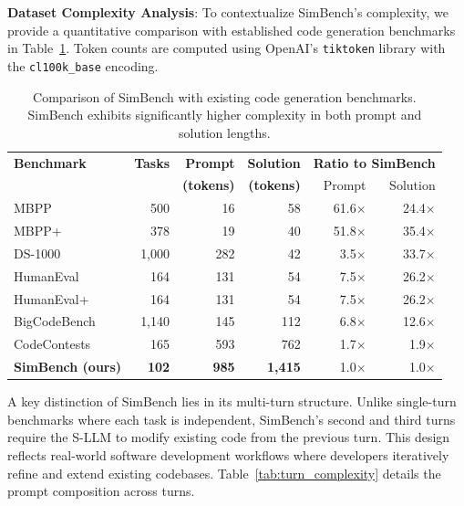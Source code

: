\documentclass{ieeeaccess}
\begin{document}
{\noindent\textbf{Dataset Complexity Analysis}}: To contextualize SimBench's complexity, we provide a quantitative comparison with established code generation benchmarks in Table~\ref{tab:benchmark_comparison}. Token counts are computed using OpenAI's \texttt{tiktoken} library with the \texttt{cl100k\_base} encoding.

\begin{table}[h!]
    \centering
    \caption{Comparison of SimBench with existing code generation benchmarks. SimBench exhibits significantly higher complexity in both prompt and solution lengths.}
    \label{tab:benchmark_comparison}
    \begin{tabular}{l r r r r r}
        \toprule
        \textbf{Benchmark} & \textbf{Tasks} & \textbf{Prompt} & \textbf{Solution} & \multicolumn{2}{c}{\textbf{Ratio to SimBench}} \\
        & & \textbf{(tokens)} & \textbf{(tokens)} & Prompt & Solution \\
        \midrule
        MBPP~\cite{austin2021program} & 500 & 16 & 58 & 61.6$\times$ & 24.4$\times$ \\
        MBPP+~\cite{liu2024your} & 378 & 19 & 40 & 51.8$\times$ & 35.4$\times$ \\
        DS-1000~\cite{lai2023ds} & 1,000 & 282 & 42 & 3.5$\times$ & 33.7$\times$ \\
        HumanEval~\cite{chen2021evaluating} & 164 & 131 & 54 & 7.5$\times$ & 26.2$\times$ \\
        HumanEval+~\cite{liu2024your} & 164 & 131 & 54 & 7.5$\times$ & 26.2$\times$ \\
        BigCodeBench~\cite{zhuo2024bigcodebench} & 1,140 & 145 & 112 & 6.8$\times$ & 12.6$\times$ \\
        CodeContests~\cite{li2022competition} & 165 & 593 & 762 & 1.7$\times$ & 1.9$\times$ \\
        \midrule
        \textbf{SimBench (ours)} & \textbf{102} & \textbf{985} & \textbf{1,415} & 1.0$\times$ & 1.0$\times$ \\
        \bottomrule
    \end{tabular}
\end{table}

A key distinction of SimBench lies in its multi-turn structure. Unlike single-turn benchmarks where each task is independent, SimBench's second and third turns require the S-LLM to modify existing code from the previous turn. This design reflects real-world software development workflows where developers iteratively refine and extend existing codebases. Table~\ref{tab:turn_complexity} details the prompt composition across turns.
\end{document}

